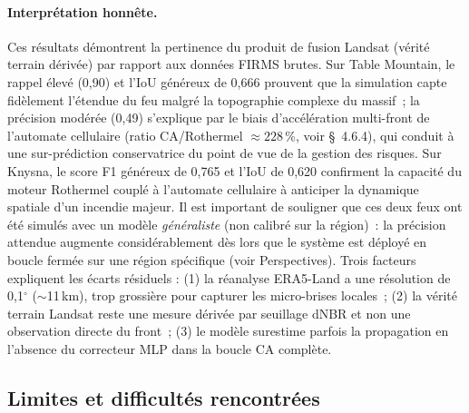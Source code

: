\paragraph{Interprétation honnête.} Ces résultats démontrent la pertinence du produit de fusion Landsat (vérité terrain dérivée) par rapport aux données FIRMS brutes. Sur Table Mountain, le rappel élevé (0,90) et l'IoU généreux de 0,666 prouvent que la simulation capte fidèlement l'étendue du feu malgré la topographie complexe du massif~; la précision modérée (0,49) s'explique par le biais d'accélération multi-front de l'automate cellulaire (ratio CA/Rothermel $\approx 228$\,\%, voir \S~4.6.4), qui conduit à une sur-prédiction conservatrice du point de vue de la gestion des risques. Sur Knysna, le score F1 généreux de 0,765 et l'IoU de 0,620 confirment la capacité du moteur Rothermel couplé à l'automate cellulaire à anticiper la dynamique spatiale d'un incendie majeur. Il est important de souligner que ces deux feux ont été simulés avec un modèle \textit{généraliste} (non calibré sur la région)~: la précision attendue augmente considérablement dès lors que le système est déployé en boucle fermée sur une région spécifique (voir Perspectives). Trois facteurs expliquent les écarts résiduels : (1) la réanalyse ERA5-Land a une résolution de 0{,}1$^\circ$ ($\sim$11\,km), trop grossière pour capturer les micro-brises locales~; (2) la vérité terrain Landsat reste une mesure dérivée par seuillage dNBR et non une observation directe du front~; (3) le modèle surestime parfois la propagation en l'absence du correcteur MLP dans la boucle CA complète.

\subsection*{Limites et difficultés rencontrées}\label{sec:limites}

